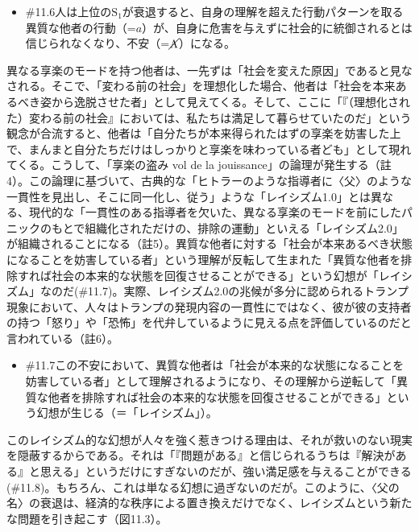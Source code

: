 \begin{note}{}
  \begin{itemize}
    \tightlist
    \item{\#11.6}人は上位の$\textrm{S}_1$が衰退すると、自身の理解を超えた行動パターンを取る異質な他者の行動（=$a$）が、自身に危害を与えずに社会的に統御されるとは信じられなくなり、不安（=$\cancel{\textrm{A}}$）になる。
  \end{itemize}
\end{note}

異なる享楽のモードを持つ他者は、一先ずは「社会を変えた原因」であると見なされる。そこで、「変わる前の社会」を理想化した場合、他者は「社会を本来あるべき姿から逸脱させた者」として見えてくる。そして、ここに「『（理想化された）変わる前の社会』においては、私たちは満足して暮らせていたのだ」という観念が合流すると、他者は「自分たちが本来得られたはずの享楽を妨害した上で、まんまと自分たちだけはしっかりと享楽を味わっている者ども」として現れてくる。こうして、「享楽の盗み
vol de la
jouissance」の論理が発生する（註4）。この論理に基づいて、古典的な「ヒトラーのような指導者に〈父〉のような一貫性を見出し、そこに同一化し、従う」ような「レイシズム1.0」とは異なる、現代的な「一貫性のある指導者を欠いた、異なる享楽のモードを前にしたパニックのもとで組織化されただけの、排除の運動」といえる「レイシズム2.0」が組織されることになる（註5）。異質な他者に対する「社会が本来あるべき状態になることを妨害している者」という理解が反転して生まれた「異質な他者を排除すれば社会の本来的な状態を回復させることができる」という幻想が「レイシズム」なのだ(\#11.7)。実際、レイシズム2.0の兆候が多分に認められるトランプ現象において、人々はトランプの発現内容の一貫性にではなく、彼が彼の支持者の持つ「怒り」や「恐怖」を代弁しているように見える点を評価しているのだと言われている（註6）。

\begin{note}{}
  \begin{itemize}
    \tightlist
    \item{\#11.7}この不安において、異質な他者は「社会が本来的な状態になることを妨害している者」として理解されるようになり、その理解から逆転して「異質な他者を排除すれば社会の本来的な状態を回復させることができる」という幻想が生じる（＝「レイシズム」）。
  \end{itemize}
\end{note}

このレイシズム的な幻想が人々を強く惹きつける理由は、それが救いのない現実を隠蔽するからである。それは「『問題がある』と信じられるうちは『解決がある』と思える」というだけにすぎないのだが、強い満足感を与えることができる(\#11.8)。もちろん、これは単なる幻想に過ぎないのだが。このように、〈父の名〉の衰退は、経済的な秩序による置き換えだけでなく、レイシズムという新たな問題を引き起こす（図11.3）。

